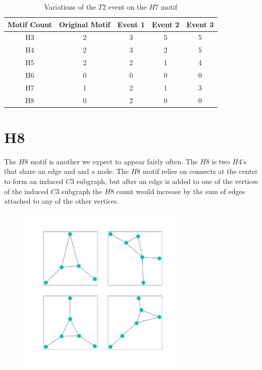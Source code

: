 \begin{table}
    \centering
    \begin{tabular}{||c c c c c||} 
    \hline
    Motif Count & Original Motif & Event 1 & Event 2 & Event 3 \\ [0.5ex] 
    \hline\hline
    H3 & 2 & 3 & 5 & 5\\ 
    \hline
    H4 & 2 & 3 & 2 & 5 \\
    \hline
    H5 & 2 & 2 & 1 & 4 \\
    \hline
    H6 & 0 & 0 & 0 & 0 \\
    \hline
    H7 & 1 & 2 & 1 & 3 \\
    \hline
    H8 & 0 & 2 & 0 & 0\\
    \hline
   \end{tabular}
   \caption{Variations of the $T2$ event on the $H7$ motif}
   \label{table:5}
\end{table}

\section{H8}
The $H8$ motif is another we expect to appear fairly often. The $H8$
is two $H4$'s that share an edge and and a node. The $H8$ motif 
relies on connects at the center to form an induced $C3$ subgraph, but after an 
edge is added to one of the vertices of the induced $C3$ subgraph the 
$H8$ count would increase by the sum of edges attached to any of the other vertices. 

\begin{figure}[!ht]
    \includegraphics[width=8cm]{Images/H8_evolution.png}
    \centering
\end{figure}

